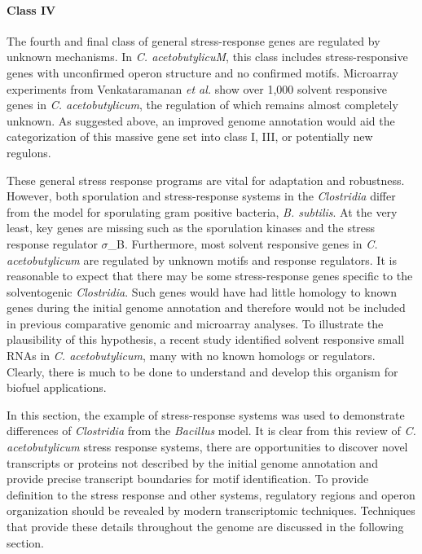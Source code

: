 \paragraph{Class IV}
The fourth and final class of general stress-response genes are regulated by unknown mechanisms.\cite{11} In \textit{C. acetobutylicuM}, this class includes stress-responsive genes with unconfirmed operon structure and no confirmed motifs. Microarray experiments from Venkataramanan \textit{et al.} show over 1,000 solvent responsive genes in \textit{C. acetobutylicum}, the regulation of which remains almost completely unknown.\cite{42} As suggested above, an improved genome annotation would aid the categorization of this massive gene set into class I, III, or potentially new regulons.

These general stress response programs are vital for adaptation and robustness. However, both sporulation and stress-response systems in the \textit{Clostridia} differ from the model for sporulating gram positive bacteria, \textit{B. subtilis}.\cite{126} At the very least, key genes are missing such as the sporulation kinases and the stress response regulator $\sigma$_B.\cite{126} Furthermore, most solvent responsive genes in \textit{C. acetobutylicum} are regulated by unknown motifs and response regulators.\cite{42} It is reasonable to expect that there may be some stress-response genes specific to the solventogenic \textit{Clostridia}. Such genes would have had little homology to known genes during the initial genome annotation and therefore would not be included in previous comparative genomic and microarray analyses.\cite{91,42} To illustrate the plausibility of this hypothesis, a recent study identified solvent responsive small RNAs in \textit{C. acetobutylicum}, many with no known homologs or regulators.\cite{39} Clearly, there is much to be done to understand and develop this organism for biofuel applications.

In this section, the example of stress-response systems was used to demonstrate differences of \textit{Clostridia} from the \textit{Bacillus} model. It is clear from this review of \textit{C. acetobutylicum} stress response systems, there are opportunities to discover novel transcripts or proteins not described by the initial genome annotation and provide precise transcript boundaries for motif identification. To provide definition to the stress response and other systems, regulatory regions and operon organization should be revealed by modern transcriptomic techniques. Techniques that provide these details throughout the genome are discussed in the following section.

